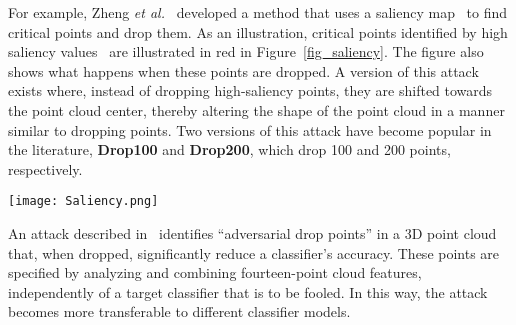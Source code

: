 \documentclass{ieeeaccess}
\def\etal{\textit{et al.}}
\begin{document}
For example, Zheng \etal~\cite{zheng2019pointcloud} developed a method that uses a saliency map~\cite{zhou2016learning} to find critical points %
and drop them. As an illustration, critical points identified %
by high saliency values~\cite{zhou2016learning} are illustrated in red in Figure~\ref{fig_saliency}. The figure also shows what happens when these points are dropped. A version of this attack exists where, instead of dropping high-saliency points, they are shifted towards the point cloud center, thereby altering the shape of the point cloud in a manner similar to dropping points. %
Two versions of this attack have become popular in the literature, %
\textbf{Drop100} and \textbf{Drop200}, which drop 100 and 200 points, respectively.


\begin{figure*}
    \centering
    \texttt{[image: Saliency.png]}
    \caption{Original point clouds with labels (left), dropped points in red associated with highest scores (middle), and adversarial point clouds with new labels (right)~\cite{zheng2019pointcloud} (© 2019 IEEE. Reprinted, with permission, from~\cite{zheng2019pointcloud}).}
    \label{fig_saliency}
\end{figure*}


An attack described in~\cite{naderi2022model} identifies ``adversarial drop points'' in a 3D point cloud that, when dropped, significantly reduce a classifier's accuracy. These points are specified by analyzing and combining fourteen-point cloud features, independently of a target classifier that is to be fooled. In this way, the attack becomes more transferable to different classifier models. %
\end{document}
